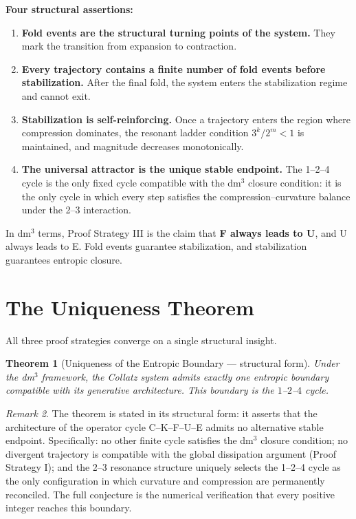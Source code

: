\documentclass[14pt, twoside, openright]{book}
\newtheorem{theorem}{Theorem}[chapter]
\theoremstyle{definition}
\theoremstyle{remark}
\newtheorem{remark}[theorem]{Remark}
\begin{document}
\medskip
\noindent\textbf{Four structural assertions:}

\begin{enumerate}[leftmargin=2em]
  \item \textbf{Fold events are the structural turning points of the system.}
        They mark the transition from expansion to contraction.

  \item \textbf{Every trajectory contains a finite number of fold events before
        stabilization.} After the final fold, the system enters the stabilization
        regime and cannot exit.

  \item \textbf{Stabilization is self-reinforcing.} Once a trajectory enters the
        region where compression dominates, the resonant ladder condition
        $3^{k}/2^{m} < 1$ is maintained, and magnitude decreases monotonically.

  \item \textbf{The universal attractor is the unique stable endpoint.} The 1--2--4
        cycle is the only fixed cycle compatible with the dm$^{3}$ closure
        condition: it is the only cycle in which every step satisfies
        the compression--curvature balance under the 2--3 interaction.
\end{enumerate}

\medskip
In dm$^{3}$ terms, Proof Strategy III is the claim that \textbf{F always leads
to U}, and U always leads to E. Fold events guarantee stabilization, and
stabilization guarantees entropic closure.

\section{The Uniqueness Theorem}

All three proof strategies converge on a single structural insight.

\begin{theorem}[Uniqueness of the Entropic Boundary — structural form]
Under the dm$^{3}$ framework, the Collatz system admits exactly one entropic
boundary compatible with its generative architecture. This boundary is the
$1$--$2$--$4$ cycle.
\end{theorem}

\begin{remark}
The theorem is stated in its structural form: it asserts that the architecture
of the operator cycle C--K--F--U--E admits no alternative stable endpoint.
Specifically: no other finite cycle satisfies the dm$^{3}$ closure condition;
no divergent trajectory is compatible with the global dissipation argument
(Proof Strategy I); and the 2--3 resonance structure uniquely selects the 1--2--4
cycle as the only configuration in which curvature and compression are permanently
reconciled. The full conjecture is the numerical verification that every positive
integer reaches this boundary.
\end{remark}
\end{document}

